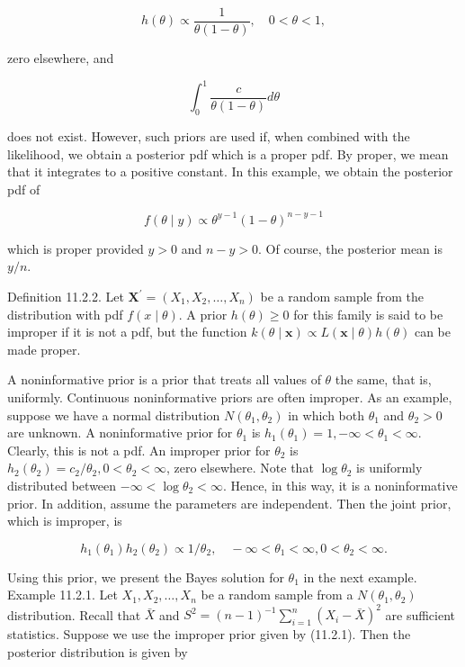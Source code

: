 $$
h(\theta) \propto \frac{1}{\theta(1-\theta)}, \quad 0<\theta<1,
$$

zero elsewhere, and

$$
\int_{0}^{1} \frac{c}{\theta(1-\theta)} d \theta
$$

does not exist. However, such priors are used if, when combined with the likelihood, we obtain a posterior pdf which is a proper pdf. By proper, we mean that it integrates to a positive constant. In this example, we obtain the posterior pdf of

$$
f(\theta \mid y) \propto \theta^{y-1}(1-\theta)^{n-y-1}
$$

which is proper provided $y>0$ and $n-y>0$. Of course, the posterior mean is $y / n$.

Definition 11.2.2. Let $\mathbf{X}^{\prime}=\left(X_{1}, X_{2}, \ldots, X_{n}\right)$ be a random sample from the distribution with pdf $f(x \mid \theta)$. A prior $h(\theta) \geq 0$ for this family is said to be improper if it is not a pdf, but the function $k(\theta \mid \mathbf{x}) \propto L(\mathbf{x} \mid \theta) h(\theta)$ can be made proper.

A noninformative prior is a prior that treats all values of $\theta$ the same, that is, uniformly. Continuous noninformative priors are often improper. As an example, suppose we have a normal distribution $N\left(\theta_{1}, \theta_{2}\right)$ in which both $\theta_{1}$ and $\theta_{2}>0$ are unknown. A noninformative prior for $\theta_{1}$ is $h_{1}\left(\theta_{1}\right)=1,-\infty<\theta_{1}<\infty$. Clearly, this is not a pdf. An improper prior for $\theta_{2}$ is $h_{2}\left(\theta_{2}\right)=c_{2} / \theta_{2}, 0<\theta_{2}<\infty$, zero elsewhere. Note that $\log \theta_{2}$ is uniformly distributed between $-\infty<\log \theta_{2}<\infty$. Hence, in this way, it is a noninformative prior. In addition, assume the parameters are independent. Then the joint prior, which is improper, is


\begin{equation*}
h_{1}\left(\theta_{1}\right) h_{2}\left(\theta_{2}\right) \propto 1 / \theta_{2}, \quad-\infty<\theta_{1}<\infty, 0<\theta_{2}<\infty . \tag{11.2.1}
\end{equation*}


Using this prior, we present the Bayes solution for $\theta_{1}$ in the next example.\\
Example 11.2.1. Let $X_{1}, X_{2}, \ldots, X_{n}$ be a random sample from a $N\left(\theta_{1}, \theta_{2}\right)$ distribution. Recall that $\bar{X}$ and $S^{2}=(n-1)^{-1} \sum_{i=1}^{n}\left(X_{i}-\bar{X}\right)^{2}$ are sufficient statistics. Suppose we use the improper prior given by (11.2.1). Then the posterior distribution is given by

